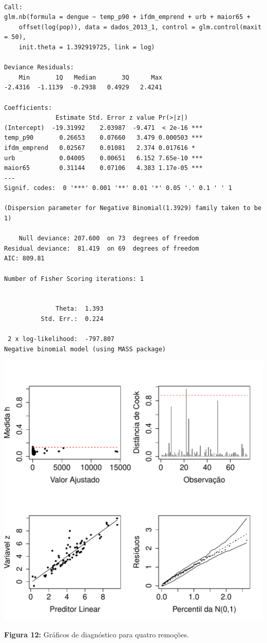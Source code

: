 \documentclass[12pt,a4paper]{article}\usepackage[]{graphicx}\usepackage[]{color}
\makeatletter
\def\maxwidth{ %
  \ifdim\Gin@nat@width>\linewidth
    \linewidth
  \else
    \Gin@nat@width
  \fi
}
\newenvironment{kframe}{%
 \def\at@end@of@kframe{}%
 \ifinner\ifhmode%
  \def\at@end@of@kframe{\end{minipage}}%
  \begin{minipage}{\columnwidth}%
 \fi\fi%
 \def\FrameCommand##1{\hskip\@totalleftmargin \hskip-\fboxsep
 \colorbox{shadecolor}{##1}\hskip-\fboxsep
     \hskip-\linewidth \hskip-\@totalleftmargin \hskip\columnwidth}%
 \MakeFramed {\advance\hsize-\width
   \@totalleftmargin\z@ \linewidth\hsize
   \@setminipage}}%
 {\par\unskip\endMakeFramed%
 \at@end@of@kframe}
\newenvironment{knitrout}{}{} %
\makeatother
\begin{document}
\begin{knitrout}
\color{fgcolor}\begin{kframe}
\begin{verbatim}

Call:
glm.nb(formula = dengue ~ temp_p90 + ifdm_emprend + urb + maior65 + 
    offset(log(pop)), data = dados_2013_1, control = glm.control(maxit = 50), 
    init.theta = 1.392919725, link = log)

Deviance Residuals: 
    Min       1Q   Median       3Q      Max  
-2.4316  -1.1139  -0.2938   0.4929   2.4241  

Coefficients:
              Estimate Std. Error z value Pr(>|z|)    
(Intercept)  -19.31992    2.03987  -9.471  < 2e-16 ***
temp_p90       0.26653    0.07660   3.479 0.000503 ***
ifdm_emprend   0.02567    0.01081   2.374 0.017616 *  
urb            0.04005    0.00651   6.152 7.65e-10 ***
maior65        0.31144    0.07106   4.383 1.17e-05 ***
---
Signif. codes:  0 '***' 0.001 '**' 0.01 '*' 0.05 '.' 0.1 ' ' 1

(Dispersion parameter for Negative Binomial(1.3929) family taken to be 1)

    Null deviance: 207.600  on 73  degrees of freedom
Residual deviance:  81.419  on 69  degrees of freedom
AIC: 809.81

Number of Fisher Scoring iterations: 1


              Theta:  1.393 
          Std. Err.:  0.224 

 2 x log-likelihood:  -797.807 
Negative binomial model (using MASS package) 
\end{verbatim}
\end{kframe}
\includegraphics[width=\maxwidth]{figure/unnamed-chunk-30-1} 

\end{knitrout}
\textbf{Figura 12:} Gráficos de diagnóstico para quatro remoções.
\end{document}

